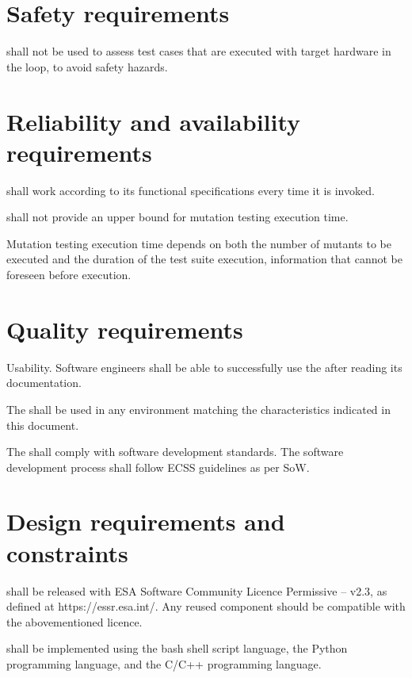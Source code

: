 \section{Safety requirements}

\RQ{} \FAQAS shall not be used to assess test cases that are executed with target hardware in the loop, to avoid safety hazards.

\section{Reliability and availability requirements}

\RQ{} \FAQAS shall work according to its functional specifications every time it is invoked.


\RQ{} \FAQAS shall not provide an upper bound for mutation testing execution time.

\remark Mutation testing execution time depends on both the number of mutants to be executed and the duration of the test suite execution, information that cannot be foreseen before execution.

\section{Quality requirements}

\RQ{} Usability. Software engineers shall be able to successfully use the \FAQAS after reading its documentation.

\RQ{} The \FAQAS shall be used in any environment matching the characteristics indicated in this document.

\RQ{} The \FAQAS shall comply with software development standards. The software development process shall follow ECSS guidelines as per SoW.


\section{Design requirements and constraints}

\RQ{} \FAQAS shall be released with ESA Software Community Licence Permissive – v2.3, as defined at https://essr.esa.int/. Any reused component should be compatible with the abovementioned licence.

\RQ{} \FAQAS shall be implemented using the bash shell script language, the Python programming language, and the C/C++ programming language.

